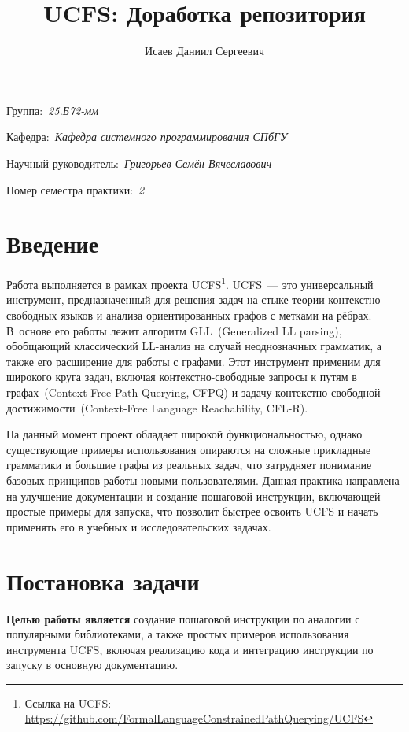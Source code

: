 \documentclass[a4paper]{article}
\title{UCFS: Доработка репозитория}
\author{Исаев Даниил Сергеевич}
\date{}
\begin{document}
\maketitle

\begin{flushright}
    Группа:~\emph{25.Б72-мм}

    Кафедра:~\emph{Кафедра системного программирования СПбГУ}

    Научный руководитель:~\emph{Григорьев Семён Вячеславович}
    
    Номер семестра практики:~\emph{2}
\end{flushright} 

\section{Введение}

Работа выполняется в рамках проекта UCFS\footnote{Ссылка на UCFS: \url{https://github.com/FormalLanguageConstrainedPathQuerying/UCFS}}. UCFS~--- это универсальный инструмент, предназначенный для решения задач на стыке теории контекстно-свободных языков и анализа ориентированных графов с метками на рёбрах. В~основе его работы лежит алгоритм GLL~(Generalized LL parsing), обобщающий классический LL-анализ на случай неоднозначных грамматик, а также его расширение для работы с графами. Этот инструмент применим для широкого круга задач, включая контекстно-свободные запросы к путям в графах~(Context-Free Path Querying, CFPQ) и задачу контекстно-свободной достижимости~(Context-Free Language Reachability, CFL-R).

На данный момент проект обладает широкой функциональностью, однако существующие примеры использования опираются на сложные прикладные грамматики и большие графы из реальных задач, что затрудняет понимание базовых принципов работы новыми пользователями. Данная практика направлена на улучшение документации и создание пошаговой инструкции, включающей простые примеры для запуска, что позволит быстрее освоить UCFS и начать применять его в учебных и исследовательских задачах.

\section{Постановка задачи}

\textbf{Целью работы является} создание пошаговой инструкции по аналогии с популярными библиотеками, а также простых примеров использования инструмента UCFS, включая реализацию кода и интеграцию инструкции по запуску в основную документацию.
\end{document}
